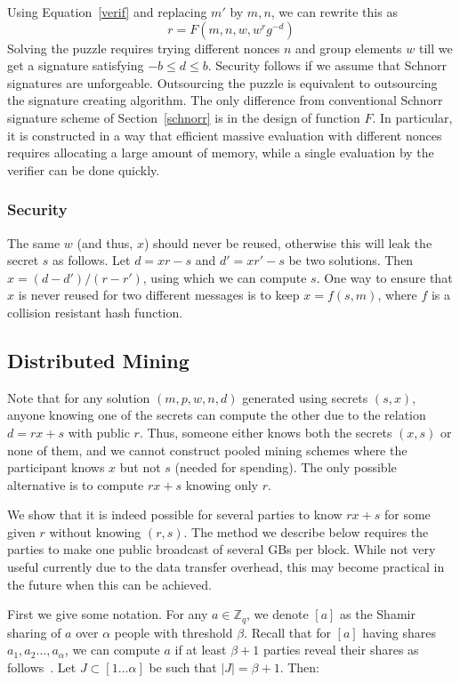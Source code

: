 \documentclass[11pt]{article}
\begin{document}
Using Equation~\ref{verif} and replacing ${m'}$ by $m, n$, we can rewrite this as 
\begin{equation}\label{eqn2}
r = F(m, n,w,w^rg^{-d})
\end{equation}
Solving the puzzle requires trying different nonces $n$ and group elements $w$ till we get a signature satisfying $-b\leq d \leq b$. 
Security follows if we assume that Schnorr signatures are unforgeable. Outsourcing the puzzle is equivalent to outsourcing the signature creating algorithm. The only difference from conventional Schnorr signature scheme of Section~\ref{schnorr} is in the design of function $F$. In particular, it is constructed in a way that efficient massive evaluation with different nonces requires allocating a large amount of memory, while a single evaluation by the verifier can be done quickly.

\subsubsection{Security} 
The same $w$ (and thus, $x$) should never be reused, otherwise this will leak the secret ${s}$ as follows. Let $d = xr-{s}$ and $d' = xr'-{s}$ be two solutions. Then $x = (d-d')/(r-r')$, using which we can compute $s$. One way to ensure that $x$ is never reused for two different messages is to keep $x = f(s, m)$, where $f$ is a collision resistant hash function.

\subsection{Distributed Mining}

Note that for any solution $(m, p, w, n, d)$ generated using secrets $(s, x)$, anyone knowing one of the secrets can compute the other due to the relation $d = rx+s$ with public $r$. Thus, someone either knows both the secrets $(x, s)$ or none of them, and we cannot construct pooled mining schemes where the participant knows $x$ but not $s$ (needed for spending). The only possible alternative is to compute $rx+s$ knowing only $r$. 


We show that it is indeed possible for several parties to know $rx+s$ for some given $r$ without knowing $(r, s)$. 
The method we describe below requires the parties to make one public broadcast of several GBs per block. While not very useful currently due to the data transfer overhead, this may become practical in the future when this can be achieved. 

First we give some notation. For any $a\in \mathbb{Z}_q$, we denote $[a]$ as the Shamir sharing of $a$ over $\alpha$ people with threshold $\beta$. Recall that for $[a]$ having shares $a_1, a_2\ldots, a_\alpha$, we can compute $a$ if at least $\beta+1$ parties reveal their shares as follows~\cite{shamir1979share}. Let $J\subset [1\ldots\alpha]$ be such that  $|J| = \beta + 1$. Then: 
\end{document}
